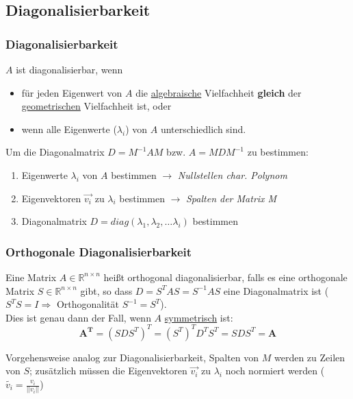 \subsection{Diagonalisierbarkeit}

\subsubsection{Diagonalisierbarkeit}
\(A\) ist diagonalisierbar, wenn
\begin{itemize}
    \item für jeden Eigenwert von \(A\) die \underline{algebraische} Vielfachheit \textbf{gleich} der \underline{geometrischen} Vielfachheit ist, oder
    \item wenn alle Eigenwerte (\(\lambda_i\)) von \(A\) unterschiedlich sind.
\end{itemize}

Um die Diagonalmatrix \(D = M^{-1}AM\) bzw. \(A=MDM^{-1}\) zu bestimmen:
\begin{enumerate}
    \item Eigenwerte \(\lambda_i\) von \(A\) bestimmen \(\rightarrow\) \textit{Nullstellen char. Polynom}
    \item Eigenvektoren \(\vec{v_i}\) zu \(\lambda_i\) bestimmen \(\rightarrow\) \textit{Spalten der Matrix M}
    \item Diagonalmatrix \(D = diag(\lambda_1, \lambda_2, \hdots \lambda_i)\) bestimmen
\end{enumerate}

\subsubsection{Orthogonale Diagonalisierbarkeit}

Eine Matrix \(A \in \mathbb{R}^{n \times n}\) heißt orthogonal diagonalisierbar, falls es eine orthogonale Matrix \(S \in \mathbb{R}^{n \times n}\) gibt, so dass \(D = S^T A S = S^{-1}AS\) eine Diagonalmatrix ist (\(S^T S = I \Rightarrow \) Orthogonalität \(S^{-1} = S^T\)).\\

Dies ist genau dann der Fall, wenn \(A\) \underline{symmetrisch}  ist:
\begin{equation*}
    \boldsymbol{A^T} = (S D S^T)^T = (S^T)^T D^T S^T = SDS^T = \boldsymbol{A}
\end{equation*}

Vorgehensweise analog zur Diagonalisierbarkeit, Spalten von \(M\) werden zu Zeilen von \(S\); zusätzlich müssen die Eigenvektoren \(\vec{v_i}\) zu \(\lambda_i\) noch normiert werden (\(\tilde{v_i}=\frac{v_i}{||v_i||} \))
